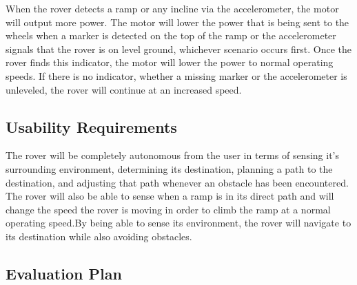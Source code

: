 When the rover detects a ramp or any incline via the accelerometer, the motor will output more power. The motor will lower the power that is being sent to the wheels when a marker is detected on the top of the ramp or the accelerometer signals that the rover is on level ground, whichever scenario occurs first. Once the rover finds this indicator, the motor will lower the power to normal operating speeds. If there is no indicator, whether a missing marker or the accelerometer is unleveled, the rover will continue at an increased speed.

\subsection*{Usability Requirements}
The rover will be completely autonomous from the user in terms of sensing it’s surrounding environment, determining its destination, planning a path to the destination, and adjusting that path whenever an obstacle has been encountered. The rover will also be able to sense when a ramp is in its direct path and will change the speed the rover is moving in order to climb the ramp at a normal operating speed.By being able to sense its environment, the rover will navigate to its destination while also avoiding obstacles. 

\subsection*{Evaluation Plan}






